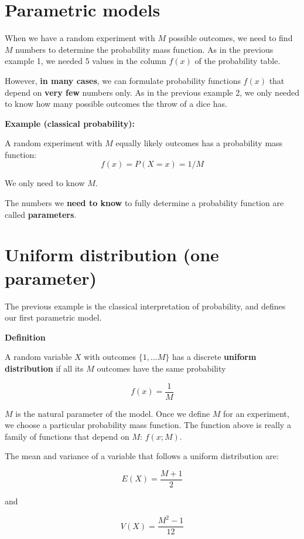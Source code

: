 \documentclass[
]{book}
\begin{document}
\hypertarget{parametric-models}{%
\section{Parametric models}\label{parametric-models}}

When we have a random experiment with \(M\) possible outcomes, we need to find \(M\) numbers to determine the probability mass function. As in the previous example 1, we needed \(5\) values in the column \(f(x)\) of the probability table.

However, \textbf{in many cases}, we can formulate probability functions \(f(x)\) that depend on \textbf{very few} numbers only. As in the previous example 2, we only needed to know how many possible outcomes the throw of a dice has.

\textbf{Example (classical probability):}

A random experiment with \(M\) equally likely outcomes has a probability mass function:
\[f(x)=P(X=x)=1/M\]

We only need to know \(M\).

The numbers we \textbf{need to know} to fully determine a probability function are called \textbf{parameters}.

\hypertarget{uniform-distribution-one-parameter}{%
\section{Uniform distribution (one parameter)}\label{uniform-distribution-one-parameter}}

The previous example is the classical interpretation of probability, and defines our first parametric model.

\textbf{Definition}

A random variable \(X\) with outcomes \(\{1,...M\}\) has a discrete \textbf{uniform distribution} if all its \(M\) outcomes have the same probability

\[f(x)=\frac{1}{M}\]

\(M\) is the natural parameter of the model. Once we define \(M\) for an experiment, we choose a particular probability mass function. The function above is really a family of functions that depend on \(M\): \(f(x; M)\).

The mean and variance of a variable that follows a uniform distribution are:

\[E(X)= \frac{M+1}{2}\]

and

\[V(X)= \frac{M^2-1}{12}\]
\end{document}
